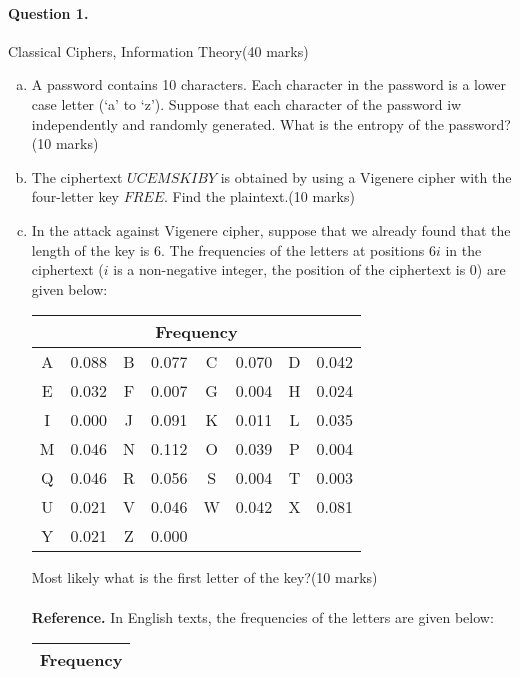 \documentclass[12pt]{article}
\begin{document}
\paragraph{Question 1.}   Classical Ciphers, Information Theory\hfill (40 marks)
\begin{enumerate}[(a)]
    \item A password contains 10 characters. Each character in the password is a lower case letter (`a' to `z'). Suppose that each character of the password iw independently and randomly generated. What is the entropy of the password? \hfill(10 marks)
    \item The ciphertext $UCEMSKIBY$ is obtained by using a Vigenere cipher with the four-letter key $FREE$. Find the plaintext.\hfill (10 marks)
    \item In the attack against Vigenere cipher, suppose that we already found that the length of the key is 6. The frequencies of the letters at positions $6i$ in the ciphertext ($i$ is a non-negative integer, the position of the ciphertext is 0) are given below:
    \begin{table}[H]
    \centering
    \begin{tabular}{|cc|cc|cc|cc|}
    \hline
    \multicolumn{8}{|c|}{Frequency}               \\ \hline
    A & 0.088 & B & 0.077 & C & 0.070 & D & 0.042 \\ \hline
    E & 0.032 & F & 0.007 & G & 0.004 & H & 0.024 \\ \hline
    I & 0.000 & J & 0.091 & K & 0.011 & L & 0.035 \\ \hline
    M & 0.046 & N & 0.112 & O & 0.039 & P & 0.004 \\ \hline
    Q & 0.046 & R & 0.056 & S & 0.004 & T & 0.003 \\ \hline
    U & 0.021 & V & 0.046 & W & 0.042 & X & 0.081 \\ \hline
    Y & 0.021 & Z & 0.000 & \multicolumn{4}{c|}{} \\ \hline
    \end{tabular}
    \end{table}
    Most likely what is the first letter of the key?\hfill (10 marks)\\\\
    \textbf{Reference.} In English texts, the frequencies of the letters are given below:
    \begin{table}[H]
    \centering
    \begin{tabular}{|cc|cc|cc|cc|}
    \hline
    \multicolumn{8}{|c|}{Frequency}               \\ \hline

\end{tabular}
\end{table}
\end{enumerate}
\end{document}
